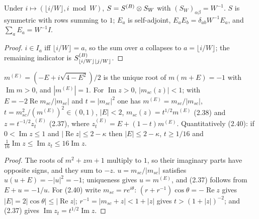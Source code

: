 \begin{lemma}[$S=\SB\otimes S_W$ and properties of $E_a$]\label{lem:model}
  \leanok{}
  Under $i\mapsto(\lfloor i/W\rfloor, i\bmod W)$, $S=\SB\otimes S_W$ with
  $(S_W)_{\alpha\beta}=W^{-1}$.  $S$ is symmetric with rows summing to $1$;
  $E_a$ is self-adjoint, $E_aE_b=\delta_{ab}W^{-1}E_a$, and $\sum_a E_a=W^{-1}I$.
\end{lemma}
\begin{proof}\leanok{}
  $i\in I_a$ iff $\lfloor i/W\rfloor=a$, so the sum over $a$ collapses to
  $a=\lfloor i/W\rfloor$; the remaining indicator is $S^{(B)}_{\lfloor i/W\rfloor\lfloor j/W\rfloor}$.
\end{proof}

\begin{lemma}\label{lem:2.8}
  \leanok
  $m^{(E)}=(-E+i\sqrt{4-E^2})/2$ is the unique root of $m(m+E)=-1$ with $\operatorname{Im}m>0$,
  and $|m^{(E)}|=1$.  For $\operatorname{Im}z>0$, $|m_{sc}(z)|<1$; with
  $E=-2\operatorname{Re}m_{sc}/|m_{sc}|$ and $t=|m_{sc}|^2$ one has
  $m^{(E)}=m_{sc}/|m_{sc}|$, $t=m_{sc}^2/(m^{(E)})^2\in(0,1)$, $|E|<2$,
  $m_{sc}(z)=t^{1/2}m^{(E)}$ (2.38) and $z=t^{-1/2}z^{(E)}_t$ (2.37), where
  $z^{(E)}_t=E+(1-t)m^{(E)}$.  Quantitatively (2.40): if $0<\operatorname{Im}z\le1$ and
  $|\operatorname{Re}z|\le2-\kappa$ then $|E|\le2-\kappa$, $t\ge1/16$ and
  $\tfrac1{16}\operatorname{Im}z\le\operatorname{Im}z_t\le16\operatorname{Im}z$.
\end{lemma}
\begin{proof}\leanok
  The roots of $m^2+zm+1$ multiply to $1$, so their imaginary parts have opposite signs,
  and they sum to $-z$.  $u=m_{sc}/|m_{sc}|$ satisfies $u(u+E)=-|u|^2=-1$; uniqueness gives
  $u=m^{(E)}$, and (2.37) follows from $E+u=-1/u$.  For (2.40) write $m_{sc}=re^{i\theta}$:
  $(r+r^{-1})\cos\theta=-\operatorname{Re}z$ gives $|E|=2|\cos\theta|\le|\operatorname{Re}z|$;
  $r^{-1}=|m_{sc}+z|<1+|z|$ gives $t>(1+|z|)^{-2}$; and (2.37) gives
  $\operatorname{Im}z_t=t^{1/2}\operatorname{Im}z$.
\end{proof}

